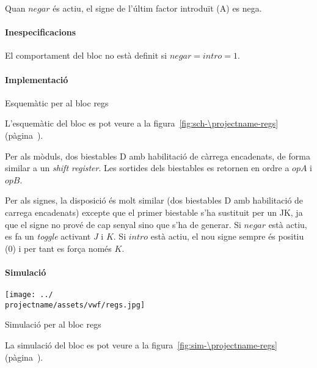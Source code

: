 Quan $negar$ és actiu, el signe de l'últim factor introduït (A) es nega.

\paragraph{Inespecificacions}


El comportament del bloc no està definit si $negar = intro = 1$.


\paragraph{Implementació}

\begin{contendfig}
  \begin{center}
  \end{center}
  \caption{\label{fig:sch-\projectname-regs} Esquemàtic per al bloc \textsf{regs}}
\end{contendfig}

L'esquemàtic del bloc es pot veure a la figura~\ref{fig:sch-\projectname-regs} (pàgina~\pageref{fig:sch-\projectname-regs}).

Per als mòduls, dos biestables D amb habilitació de càrrega encadenats, de forma
similar a un \emph{shift register}. Les sortides dels biestables es retornen en
ordre a $opA$ i $opB$.

Per als signes, la disposició és molt similar (dos biestables D amb habilitació
de carrega encadenats) excepte que el primer biestable s'ha sustituit per un JK,
ja que el signe no prové de cap senyal sino que s'ha de generar. Si $negar$ està
actiu, es fa un \emph{toggle} activant $J$ i $K$. Si $intro$ està actiu, el nou
signe sempre és positiu (0) i per tant es força només $K$.

\paragraph{Simulació}

\begin{contendfig}
  \begin{center}
    \texttt{[image: ../\\projectname/assets/vwf/regs.jpg]}
  \end{center}
  \caption{\label{fig:sim-\projectname-regs} Simulació per al bloc \textsf{regs}}
\end{contendfig}

La simulació del bloc es pot veure a la figura~\ref{fig:sim-\projectname-regs} (pàgina~\pageref{fig:sim-\projectname-regs}).


\vspace{1cm}
